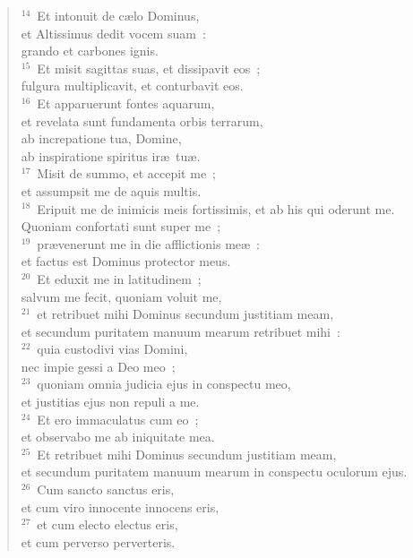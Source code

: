 \begin{verse}
${}^{14}$~Et intonuit de c\ae lo Dominus,\\ et Altissimus dedit vocem suam~:\\ grando et carbones ignis.\\
${}^{15}$~Et misit sagittas suas, et dissipavit eos~;\\ fulgura multiplicavit, et conturbavit eos.\\
${}^{16}$~Et apparuerunt fontes aquarum,\\ et revelata sunt fundamenta orbis terrarum,\\ ab increpatione tua, Domine,\\ ab inspiratione spiritus ir\ae\ tu\ae .\\
${}^{17}$~Misit de summo, et accepit me~;\\ et assumpsit me de aquis multis.\\
${}^{18}$~Eripuit me de inimicis meis fortissimis, et ab his qui oderunt me.\\ Quoniam confortati sunt super me~;\\
${}^{19}$~pr\ae venerunt me in die afflictionis me\ae~:\\ et factus est Dominus protector meus.\\
${}^{20}$~Et eduxit me in latitudinem~;\\ salvum me fecit, quoniam voluit me,\\
${}^{21}$~et retribuet mihi Dominus secundum justitiam meam,\\ et secundum puritatem manuum mearum retribuet mihi~:\\
${}^{22}$~quia custodivi vias Domini,\\ nec impie gessi a Deo meo~;\\
${}^{23}$~quoniam omnia judicia ejus in conspectu meo,\\ et justitias ejus non repuli a me.\\
${}^{24}$~Et ero immaculatus cum eo~;\\ et observabo me ab iniquitate mea.\\
${}^{25}$~Et retribuet mihi Dominus secundum justitiam meam,\\ et secundum puritatem manuum mearum in conspectu oculorum ejus.\\
${}^{26}$~Cum sancto sanctus eris,\\ et cum viro innocente innocens eris,\\
${}^{27}$~et cum electo electus eris,\\ et cum perverso perverteris.\\

\end{verse}
